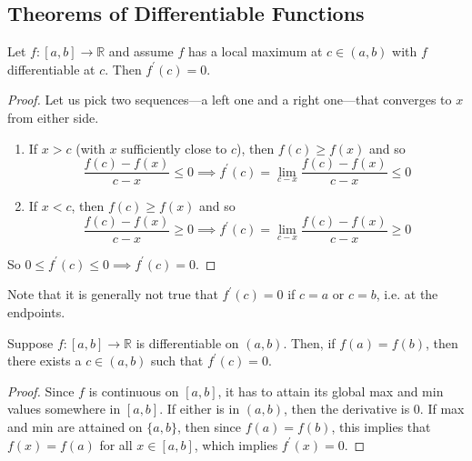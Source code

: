 \subsection{Theorems of Differentiable Functions}

  \begin{theorem}
    Let $f: [a, b] \to \mathbb{R}$ and assume $f$ has a local maximum at $c \in (a, b)$ with $f$ differentiable at $c$. Then $f^\prime (c) = 0$. 
  \end{theorem}
  \begin{proof}
    Let us pick two sequences---a left one and a right one---that converges to $x$ from either side. 
    \begin{enumerate}
      \item If $x > c$ (with $x$ sufficiently close to $c$), then $f(c) \geq f(x)$ and so 
      \begin{equation}
        \frac{f(c) - f(x)}{c - x} \leq 0 \implies f^\prime (c) = \lim_{c - x} \frac{f(c) - f(x)}{c - x} \leq 0
      \end{equation}

      \item If $x < c$, then $f(c) \geq f(x)$ and so 
      \begin{equation}
        \frac{f(c) - f(x)}{c - x} \geq 0 \implies f^\prime (c) = \lim_{c - x} \frac{f(c) - f(x)}{c - x} \geq 0
      \end{equation}
    \end{enumerate}
    So $0 \leq f^\prime (c) \leq 0 \implies f^\prime(c) = 0$. 
  \end{proof}

  Note that it is generally not true that $f^\prime (c) = 0$ if $c = a$ or $c = b$, i.e. at the endpoints. 

  \begin{theorem}
    Suppose $f: [a, b] \to \mathbb{R}$ is differentiable on $(a, b)$. Then, if $f(a) = f(b)$, then there exists a $c \in (a, b)$ such that $f^\prime (c) = 0$. 
  \end{theorem}
  \begin{proof}
    Since $f$ is continuous on $[a, b]$, it has to attain its global max and min values somewhere in $[a, b]$. If either is in $(a, b)$, then the derivative is $0$. If max and min are attained on $\{a, b\}$, then since $f(a) = f(b)$, this implies that $f(x) = f(a)$ for all $x \in [a, b]$, which implies $f^\prime (x) = 0$. 
  \end{proof}

